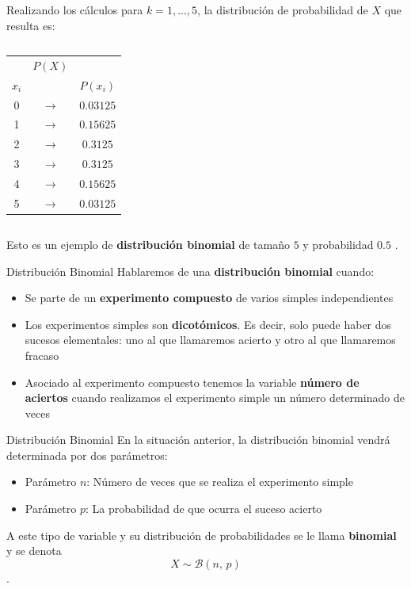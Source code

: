 \documentclass[11pt,handout]{beamer}
\begin{document}
\begin{frame}{}
Realizando los cálculos para $k = 1,...,5 $, la distribución de probabilidad de $X$ que resulta es:
\begin{columns}
\begin{column}{0.3\textwidth}
\begin{center}
\begin{tabular}{ccc}
 & $P(X)$ &  \\
$x_i$ &  &  $P(x_i)$\\ \hline 
0 & $\rightarrow$ & $0.03125$ \\ 
1 & $\rightarrow$ & $0.15625$ \\ 
2 & $\rightarrow$ & $0.3125$ \\ 
3 & $\rightarrow$ & $0.3125$ \\ 
4 & $\rightarrow$ & $0.15625$ \\ 
5 & $\rightarrow$ & $0.03125$ \\ 
\end{tabular} 
\end{center}
\end{column}
\begin{column}{0.7\textwidth}
\begin{center}

\end{center}
\end{column}

\end{columns}
\pause
Esto es un ejemplo de \textbf{distribución binomial} de tamaño $5$ y probabilidad $0.5$ .
\end{frame}



\begin{frame}{Distribución Binomial}
Hablaremos de una \textbf{distribución binomial} cuando:
\begin{itemize}[<+->]
\item Se parte de un \textbf{experimento compuesto} de varios simples independientes
\item Los experimentos simples son \textbf{dicotómicos}. Es decir, solo puede haber dos sucesos elementales: uno al que llamaremos acierto y otro al que llamaremos fracaso
\item Asociado al experimento compuesto tenemos la variable \textbf{número de aciertos} cuando realizamos el experimento simple un número determinado de veces
\end{itemize}
\end{frame}

\begin{frame}{Distribución Binomial}
En la situación anterior, la distribución binomial vendrá determinada por dos parámetros:
\begin{itemize}[<+->]
\item Parámetro $n$: Número de veces que se realiza el experimento simple 
\item Parámetro $p$: La probabilidad de que ocurra el suceso acierto
\end{itemize}
\pause

A este tipo de variable y su distribución de probabilidades se le llama \textbf{binomial} y se denota $$X \sim \mathcal{B}(n,\,p)$$.
\end{frame}
\end{document}
